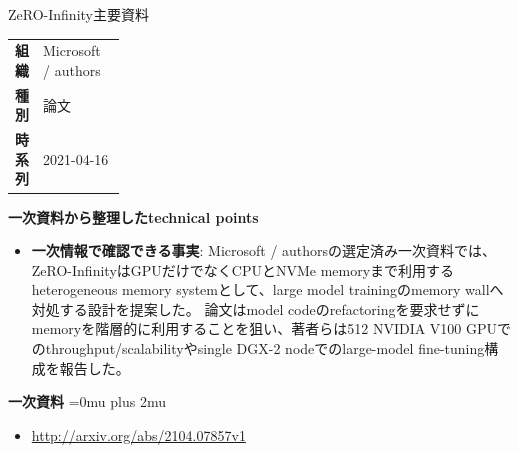 \begin{technicalnote}{ZeRO-Infinity}{主要資料}
\begingroup
\begin{tabularx}{\linewidth}{@{}>{\bfseries}p{0.22\linewidth}X@{}}
組織 & Microsoft / authors \\
種別 & 論文 \\
時系列 & 2021-04-16 \\
\end{tabularx}
\smallskip
{\bfseries 一次資料から整理したtechnical points}
\begin{itemize}[leftmargin=1.5em,itemsep=0.35em]
\item \textbf{一次情報で確認できる事実}: Microsoft / authorsの選定済み一次資料では、ZeRO-InfinityはGPUだけでなくCPUとNVMe memoryまで利用するheterogeneous memory systemとして、large model trainingのmemory wallへ対処する設計を提案した。 論文はmodel codeのrefactoringを要求せずにmemoryを階層的に利用することを狙い、著者らは512 NVIDIA V100 GPUでのthroughput/scalabilityやsingle DGX-2 nodeでのlarge-model fine-tuning構成を報告した。
\end{itemize}
\begin{minipage}{\linewidth}
\begin{samepage}
{\bfseries 一次資料}
\begingroup\sloppy
\Urlmuskip=0mu plus 2mu\relax
\begin{itemize}[leftmargin=1.5em,itemsep=0.25em]
\item {\scriptsize\url{http://arxiv.org/abs/2104.07857v1}}
\end{itemize}
\endgroup
\end{samepage}
\end{minipage}
\endgroup
\end{technicalnote}
\medskip

